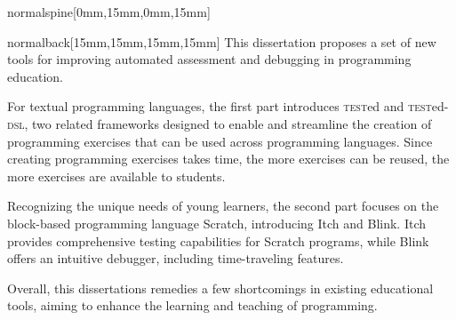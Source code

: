 \documentclass[coverheight=240mm,coverwidth=170mm,spinewidth=15mm]{bookcover}
\begin{document}
\begin{bookcover}
    \begin{bookcoverelement}{normal}{spine}[0mm,15mm,0mm,15mm]%
        \centering
        \hspace*{0.1cm}
         \par
        \vspace*{\fill}
    \end{bookcoverelement}
    \begin{bookcoverelement}{normal}{back}[15mm,15mm,15mm,15mm]
        \fontsize{12pt}{17pt}\selectfont{}\setlength{\parskip}{3mm}
        This dissertation proposes a set of new tools for improving automated assessment and debugging in programming education.

        For textual programming languages, the first part introduces \textsc{test}ed and \textsc{test}ed-\textsc{dsl}, two related frameworks designed to enable and streamline the creation of programming exercises that can be used across programming languages.
        Since creating programming exercises takes time, the more exercises can be reused, the more exercises are available to students.

        Recognizing the unique needs of young learners, the second part focuses on the block-based programming language Scratch, introducing Itch and Blink.
        Itch provides comprehensive testing capabilities for Scratch programs, while Blink offers an intuitive debugger, including time-traveling features.

        Overall, this dissertations remedies a few shortcomings in existing educational tools, aiming to enhance the learning and teaching of programming.
        \vspace*{\fill}%
        \begin{center}%
        \end{center}
    \end{bookcoverelement}
\end{bookcover}
\end{document}
